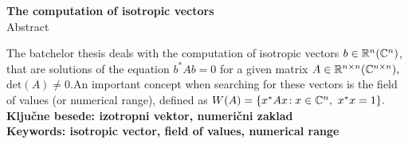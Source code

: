 \documentclass[12pt,a4paper]{amsart}\usepackage[slovene]{babel}%
\theoremstyle{definition}\newtheorem{definicija}{Definicija}[section]\newtheorem{primer}[definicija]{Primer}\newtheorem{opomba}[definicija]{Opomba}
\theoremstyle{plain}\newtheorem{lema}[definicija]{Lema}\newtheorem{izrek}[definicija]{Izrek}\newtheorem{trditev}[definicija]{Trditev}\newtheorem{posledica}[definicija]{Posledica}
\begin{document}
{\vfill\begin{center}{\bf The computation of isotropic vectors}\\[3mm]{\sc Abstract}\end{center}The batchelor thesis deals with the computation of isotropic vectors $b\in\mathbb R^{n} (\mathbb C^{n})$, that are solutions of the equation $b^\ast Ab=0$ for a given matrix $A\in\mathbb R^{n\times n} (\mathbb C^{n\times n}),$ $\text{det}(A)\ne 0$.An important concept when searching for these vectors is the field of values (or numerical range), defined as $W(A)=\{x^\ast Ax\! : x \in \mathbb C^n,\ x^\ast x=1\}.$ %
\vfill{}   \\[1mm]{\bf Ključne besede: izotropni vektor, numerični zaklad}   \\[1mm]{\bf Keywords: isotropic vector, field of values, numerical range}\pagebreak
}
\end{document}
